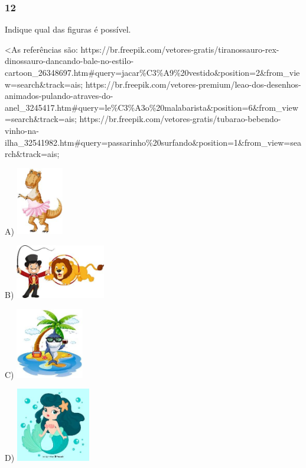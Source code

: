 \subsubsection{12}\label{section-113}

Indique qual das figuras é possível.

\textless{}As referências são:
https://br.freepik.com/vetores-gratis/tiranossauro-rex-dinossauro-dancando-bale-no-estilo-cartoon\_26348697.htm\#query=jacar\%C3\%A9\%20vestido\&position=2\&from\_view=search\&track=ais;
https://br.freepik.com/vetores-premium/leao-dos-desenhos-animados-pulando-atraves-do-anel\_3245417.htm\#query=le\%C3\%A3o\%20malabarista\&position=6\&from\_view=search\&track=ais;
https://br.freepik.com/vetores-gratis/tubarao-bebendo-vinho-na-ilha\_32541982.htm\#query=passarinho\%20surfando\&position=1\&from\_view=search\&track=ais;

A)
\includegraphics[width=0.80601in,height=1.16259in]{media/image115.jpg}

B)
\includegraphics[width=1.54211in,height=0.93118in]{media/image116.jpg}

C)
\includegraphics[width=1.16834in,height=1.20694in]{media/image117.jpg}

D)
\includegraphics[width=1.27083in,height=1.27083in]{media/image118.jpg}


